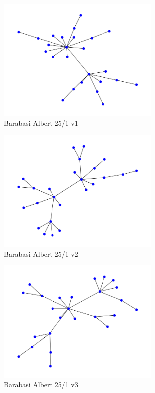 \begin{figure}
    \begin{center}
        \includegraphics[width=0.7\textwidth]{Bilder/net_topo_ba_25_1.png}
    \end{center}
    \caption{Barabasi Albert 25/1 v1}
    \label{fig:ba_25_1_1}
\end{figure}
\begin{figure}
    \begin{center}
        \includegraphics[width=0.7\textwidth]{Bilder/net_topo_ba_25_1_1.png}
    \end{center}
    \caption{Barabasi Albert 25/1 v2}
    \label{fig:ba_25_1_2}
\end{figure}
\begin{figure}
    \begin{center}
        \includegraphics[width=0.7\textwidth]{Bilder/net_topo_ba_25_1_2.png}
    \end{center}
    \caption{Barabasi Albert 25/1 v3}
    \label{fig:ba_25_1_3}
\end{figure}



